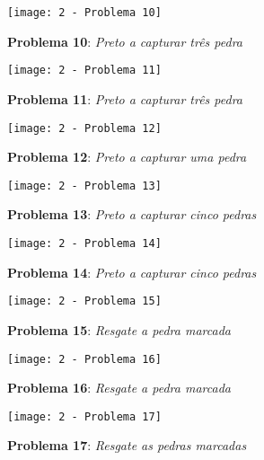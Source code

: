 \begin{figure}[p!]
    \centering
    \captionsetup{justification=raggedright,singlelinecheck=false}
    \begin{subfigure}[t]{.3\textwidth}
        \texttt{[image: 2 - Problema 10]}
        \caption*{\textbf{Problema 10}: \emph{Preto a capturar três pedra}}
    \end{subfigure}
    \hfill
    \begin{subfigure}[t]{.3\textwidth}
        \texttt{[image: 2 - Problema 11]}
        \caption*{\textbf{Problema 11}: \emph{Preto a capturar três pedra}}
    \end{subfigure}
    \hfill
    \begin{subfigure}[t]{.3\textwidth}
        \texttt{[image: 2 - Problema 12]}
        \caption*{\textbf{Problema 12}: \emph{Preto a capturar uma pedra}}
    \end{subfigure}
    \par\bigskip
    \begin{subfigure}[t]{.3\textwidth}
        \texttt{[image: 2 - Problema 13]}
        \caption*{\textbf{Problema 13}: \emph{Preto a capturar cinco pedras}}
    \end{subfigure}
    \hfill
    \begin{subfigure}[t]{.3\textwidth}
        \texttt{[image: 2 - Problema 14]}
        \caption*{\textbf{Problema 14}: \emph{Preto a capturar cinco pedras}}
    \end{subfigure}
    \hfill
    \begin{subfigure}[t]{.3\textwidth}
        \texttt{[image: 2 - Problema 15]}
        \caption*{\textbf{Problema 15}: \emph{Resgate a pedra marcada}}
    \end{subfigure}
    \par\bigskip
    \begin{subfigure}[t]{.3\textwidth}
        \texttt{[image: 2 - Problema 16]}
        \caption*{\textbf{Problema 16}: \emph{Resgate a pedra marcada}}
    \end{subfigure}
    \hfill
    \begin{subfigure}[t]{.3\textwidth}
        \texttt{[image: 2 - Problema 17]}
        \caption*{\textbf{Problema 17}: \emph{Resgate as pedras marcadas}}
    \end{subfigure}
    \hfill
    \begin{subfigure}[t]{.3\textwidth}

\end{subfigure}
\end{figure}
